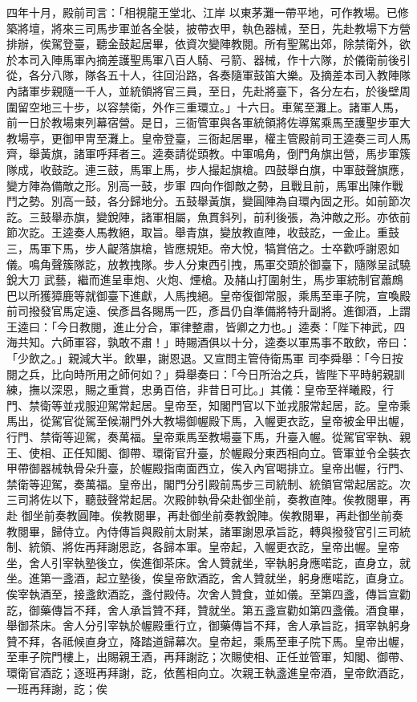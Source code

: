 \begin{pinyinscope}
 四年十月，殿前司言：「相視龍王堂北、江岸
 以東茅灘一帶平地，可作教場。已修築將壇，將來三司馬步軍並各全裝，披帶衣甲，執色器械，至日，先赴教場下方營排辦，俟駕登臺，聽金鼓起居畢，依資次變陣教閱。所有聖駕出郊，除禁衛外，欲於本司入陣馬軍內摘差護聖馬軍八百人騎、弓箭、器械，作十六隊，於儀衛前後引從，各分八隊，隊各五十人，往回沿路，各奏隨軍鼓笛大樂。及摘差本司入教陣隊內諸軍步親隨一千人，並統領將官三員，至日，先赴將臺下，各分左右，於後壁周
 圍留空地三十步，以容禁衛，外作三重環立。」十六日。車駕至灘上。諸軍人馬，前一日於教場東列幕宿營。是日，三衙管軍與各軍統領將佐導駕乘馬至護聖步軍大教場亭，更御甲冑至灘上。皇帝登臺，三衙起居畢，權主管殿前司王逵奏三司人馬齊，舉黃旗，諸軍呼拜者三。逵奏請從頭教。中軍鳴角，倒門角旗出營，馬步軍簇隊成，收鼓訖。連三鼓，馬軍上馬，步人撮起旗槍。四鼓舉白旗，中軍鼓聲旗應，變方陣為備敵之形。別高一鼓，步軍
 四向作御敵之勢，且戰且前，馬軍出陳作戰鬥之勢。別高一鼓，各分歸地分。五鼓舉黃旗，變圓陣為自環內固之形。如前節次訖。三鼓舉赤旗，變銳陣，諸軍相屬，魚貫斜列，前利後張，為沖敵之形。亦依前節次訖。王逵奏人馬教絕，取旨。舉青旗，變放教直陣，收鼓訖，一金止。重鼓三，馬軍下馬，步人齪落旗槍，皆應規矩。帝大悅，犒賞倍之。士卒歡呼謝恩如儀。鳴角聲簇隊訖，放教拽隊。步人分東西引拽，馬軍交頭於御臺下，隨隊呈試驍銳大刀
 武藝，繼而進呈車炮、火炮、煙槍。及赭山打圍射生，馬步軍統制官蕭鷓巴以所獲獐鹿等就御臺下進獻，人馬拽絕。皇帝復御常服，乘馬至車子院，宣喚殿前司撥發官馬定遠、侯彥昌各賜馬一匹，彥昌仍自準備將特升副將。進御酒，上謂王逵曰：「今日教閱，進止分合，軍律整肅，皆卿之力也。」逵奏：「陛下神武，四海共知。六師軍容，孰敢不肅！」時賜酒俱以十分，逵奏以軍馬事不敢飲，帝曰：「少飲之。」親減大半。飲畢，謝恩退。又宣問主管侍衛馬軍
 司李舜舉：「今日按閱之兵，比向時所用之師何如？」舜舉奏曰：「今日所治之兵，皆陛下平時躬親訓練，撫以深恩，賜之重賞，忠勇百倍，非昔日可比。」其儀：皇帝至祥曦殿，行門、禁衛等並戎服迎駕常起居。皇帝至，知閣門官以下並戎服常起居，訖。皇帝乘馬出，從駕官從駕至候潮門外大教場御幄殿下馬，入幄更衣訖，皇帝被金甲出幄，行門、禁衛等迎駕，奏萬福。皇帝乘馬至教場臺下馬，升臺入幄。從駕官宰執、親王、使相、正任知閣、御帶、環衛官升臺，於幄殿分東西相向立。管軍並令全裝衣甲帶御器械執骨朵升臺，於幄殿指南面西立，俟入內官喝排立。皇帝出幄，行門、禁衛等迎駕，奏萬福。皇帝出，閣門分引殿前馬步三司統制、統領官常起居訖。次三司將佐以下，聽鼓聲常起居。次殿帥執骨朵赴御坐前，奏教直陣。俟教閱畢，再赴
 御坐前奏教圓陣。俟教閱畢，再赴御坐前奏教銳陣。俟教閱畢，再赴御坐前奏教閱畢，歸侍立。內侍傳旨與殿前太尉某，諸軍謝恩承旨訖，轉與撥發官引三司統制、統領、將佐再拜謝恩訖，各歸本軍。皇帝起，入幄更衣訖，皇帝出幄。皇帝坐，舍人引宰執塾後立，俟進御茶床。舍人贊就坐，宰執躬身應喏訖，直身立，就坐。進第一盞酒，起立塾後，俟皇帝飲酒訖，舍人贊就坐，躬身應喏訖，直身立。俟宰執酒至，接盞飲酒訖，盞付殿侍。次舍人贊食，並如儀。至第四盞，傳旨宣勸訖，御藥傳旨不拜，舍人承旨贊不拜，贊就坐。第五盞宣勸如第四盞儀。酒食畢，舉御茶床。舍人分引宰執於幄殿重行立，御藥傳旨不拜，舍人承旨訖，揖宰執躬身贊不拜，各祗候直身立，降踏道歸幕次。皇帝起，乘馬至車子院下馬。皇帝出幄，至車子院門樓上，出賜親王酒，再拜謝訖；次賜使相、正任並管軍，知閣、御帶、環衛官酒訖；逐班再拜謝，訖，依舊相向立。次親王執盞進皇帝酒，皇帝飲酒訖，一班再拜謝，訖；俟

\end{pinyinscope}
